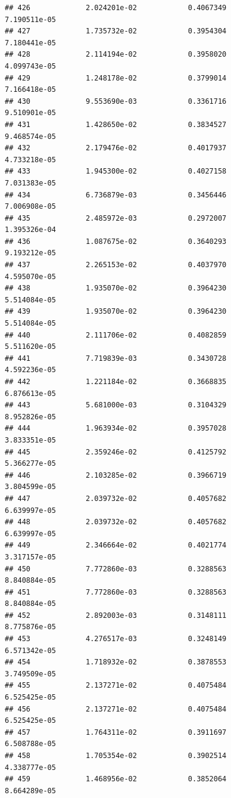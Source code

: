 \documentclass[
]{article}
\begin{document}
\begin{verbatim}
## 426             2.024201e-02            0.4067349            7.190511e-05
## 427             1.735732e-02            0.3954304            7.180441e-05
## 428             2.114194e-02            0.3958020            4.099743e-05
## 429             1.248178e-02            0.3799014            7.166418e-05
## 430             9.553690e-03            0.3361716            9.510901e-05
## 431             1.428650e-02            0.3834527            9.468574e-05
## 432             2.179476e-02            0.4017937            4.733218e-05
## 433             1.945300e-02            0.4027158            7.031383e-05
## 434             6.736879e-03            0.3456446            7.006908e-05
## 435             2.485972e-03            0.2972007            1.395326e-04
## 436             1.087675e-02            0.3640293            9.193212e-05
## 437             2.265153e-02            0.4037970            4.595070e-05
## 438             1.935070e-02            0.3964230            5.514084e-05
## 439             1.935070e-02            0.3964230            5.514084e-05
## 440             2.111706e-02            0.4082859            5.511620e-05
## 441             7.719839e-03            0.3430728            4.592236e-05
## 442             1.221184e-02            0.3668835            6.876613e-05
## 443             5.681000e-03            0.3104329            8.952826e-05
## 444             1.963934e-02            0.3957028            3.833351e-05
## 445             2.359246e-02            0.4125792            5.366277e-05
## 446             2.103285e-02            0.3966719            3.804599e-05
## 447             2.039732e-02            0.4057682            6.639997e-05
## 448             2.039732e-02            0.4057682            6.639997e-05
## 449             2.346664e-02            0.4021774            3.317157e-05
## 450             7.772860e-03            0.3288563            8.840884e-05
## 451             7.772860e-03            0.3288563            8.840884e-05
## 452             2.892003e-03            0.3148111            8.775876e-05
## 453             4.276517e-03            0.3248149            6.571342e-05
## 454             1.718932e-02            0.3878553            3.749509e-05
## 455             2.137271e-02            0.4075484            6.525425e-05
## 456             2.137271e-02            0.4075484            6.525425e-05
## 457             1.764311e-02            0.3911697            6.508788e-05
## 458             1.705354e-02            0.3902514            4.338777e-05
## 459             1.468956e-02            0.3852064            8.664289e-05

\end{verbatim}
\end{document}
